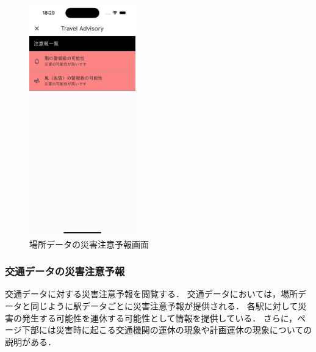\begin{figure}[H]
  \centering
  \includegraphics[height=10cm]{./fig/spot_advisory.png}
  \caption{場所データの災害注意予報画面}
  \label{fig:spot_advisory}
\end{figure}

\subsubsection {交通データの災害注意予報}
交通データに対する災害注意予報を閲覧する．
交通データにおいては，場所データと同じように駅データごとに災害注意予報が提供される．
各駅に対して災害の発生する可能性を運休する可能性として情報を提供している．
さらに，ページ下部には災害時に起こる交通機関の運休の現象や計画運休の現象についての説明がある．

